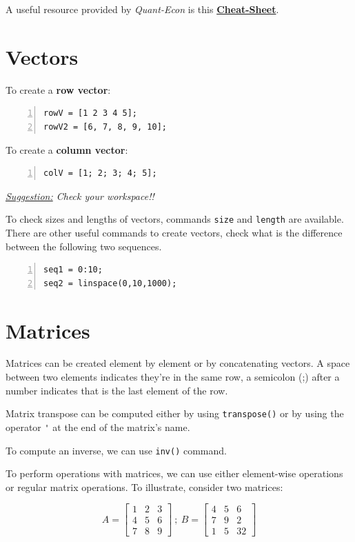 \documentclass[a4paper,11pt]{article}
\begin{document}
A useful resource provided by \textit{Quant-Econ} is this \href{https://cheatsheets.quantecon.org/}{{\textbf{Cheat-Sheet}}}.

\section{Vectors}

To create a \textbf{row vector}:

\begin{Verbatim}[numbers=left, fontsize = \small]
rowV = [1 2 3 4 5];
rowV2 = [6, 7, 8, 9, 10];
\end{Verbatim}

To create a \textbf{column vector}:

\begin{Verbatim}[numbers=left, fontsize = \small]
colV = [1; 2; 3; 4; 5];
\end{Verbatim}

\textit{\underline{Suggestion:} Check your workspace!!}

To check sizes and lengths of vectors, commands \verb+size+ and \verb+length+ are available. There are other useful commands to create vectors, check what is the difference between the following two sequences.

\begin{Verbatim}[numbers = left]
seq1 = 0:10;
seq2 = linspace(0,10,1000);
\end{Verbatim}

\section{Matrices}

Matrices can be created element by element or by concatenating vectors. A space between two elements indicates they're in the same row, a semicolon (;) after a number indicates that is the last element of the row.

Matrix transpose can be computed either by using \verb+transpose()+ or by using the operator \verb+'+ at the end of the matrix's name.

To compute an inverse, we can use \verb+inv()+ command.

To perform operations with matrices, we can use either element-wise operations or regular matrix operations. To illustrate, consider two matrices:

\[
A = \begin{bmatrix}
1 & 2 & 3 \\
4 & 5 & 6 \\
7 & 8 & 9 
\end{bmatrix} \ ; \ 
B = \begin{bmatrix}
4 & 5 & 6 \\
7 & 9 & 2 \\
1 & 5 & 32
\end{bmatrix}
\]
\end{document}
